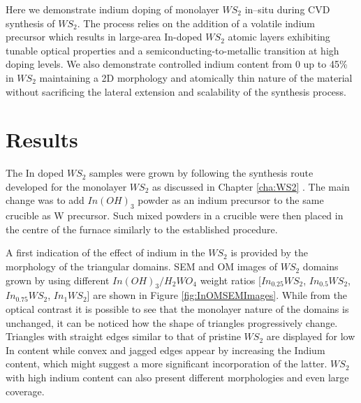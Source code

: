 Here we demonstrate indium doping of monolayer $WS_2$ in–situ during CVD synthesis of $WS_2$. The process relies on the addition of a volatile indium precursor which results in large-area In-doped $WS_2$ atomic layers exhibiting tunable optical properties and a semiconducting-to-metallic transition at high doping levels. We also demonstrate controlled indium content from 0 up to 45\% in $WS_2$ maintaining a 2D morphology and atomically thin nature of the material without sacrificing the lateral extension and scalability of the synthesis process.

\section{Results}

The In doped $WS_2$ samples were grown by following the synthesis route developed for the monolayer $WS_2$ as discussed in Chapter \ref{cha:WS2} \cite{Reale2017}. The main change was to add $In(OH)_3$ powder as an indium precursor to the same crucible as W precursor. Such mixed powders in a crucible were then placed in the centre of the furnace similarly to the established procedure.

A first indication of the effect of indium in the $WS_2$ is provided by the morphology of the triangular domains. SEM and OM images of $WS_2$ domains grown by using different $In(OH)_3/H_2WO_4$ weight ratios [$In_{0.25}WS_2$, $In_{0.5}WS_2$, $In_{0.75}WS_2$, $In_1WS_2$] are shown in Figure \ref{fig:InOMSEMImages}. While from the optical contrast it is possible to see that the monolayer nature of the domains is unchanged, it can be noticed how the shape of triangles progressively change. Triangles with straight edges similar to that of pristine $WS_2$ are displayed for low In content while convex and jagged edges appear by increasing the Indium content, which might suggest a more significant incorporation of the latter. $WS_2$ with high indium content can also present different morphologies and even large coverage.


